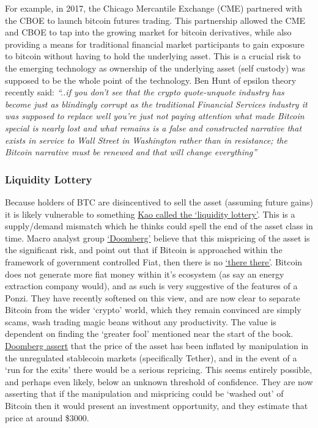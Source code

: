 For example, in 2017, the Chicago Mercantile Exchange (CME) partnered with the CBOE to launch bitcoin futures trading. This partnership allowed the CME and CBOE to tap into the growing market for bitcoin derivatives, while also providing a means for traditional financial market participants to gain exposure to bitcoin without having to hold the underlying asset. This is a crucial risk to the emerging technology as ownership of the underlying asset (self custody) was supposed to be the whole point of the technology. Ben Hunt of epsilon theory recently said: \textit{``..if you don't see that the crypto quote-unquote industry has become just as blindingly corrupt as the traditional Financial Services industry it was supposed to replace well you're just not paying attention what made Bitcoin special is nearly lost and what remains is a false and constructed narrative that exists in service to Wall Street in Washington rather than in resistance; the Bitcoin narrative must be renewed and that will change everything''}
\subsubsection{Liquidity Lottery}
Because holders of BTC are disincentived to sell the asset (assuming future gains) it is likely vulnerable to something \href{https://twitter.com/UrbanKaoboy/status/1526311908709502977}{Kao called the `liquidity lottery'}. This is a supply/demand mismatch which he thinks could spell the end of the asset class in time. Macro analyst group \href{https://doomberg.substack.com/}{`Doomberg'} believe that this mispricing of the asset is the significant risk, and point out that if Bitcoin is approached within the framework of government controlled Fiat, then there is no \href{https://en.wiktionary.org/wiki/there_is_no_there_there}{`there there'}. Bitcoin does not generate more fiat money within it's ecosystem (as say an energy extraction company would), and as such is very suggestive of the features of a Ponzi. They have recently softened on this view, and are now clear to separate Bitcoin from the wider `crypto' world, which they remain convinced are simply scams, wash trading magic beans without any productivity. The value is dependent on finding the `greater fool' mentioned near the start of the book. \href{https://doomberg.substack.com/p/dollars-ex-machina}{Doomberg assert} that the price of the asset has been inflated by manipulation in the unregulated stablecoin markets (specifically Tether), and in the event of a `run for the exits' there would be a serious repricing. This seems entirely possible, and perhaps even likely, below an unknown threshold of confidence. They are now asserting that if the manipulation and mispricing could be `washed out' of Bitcoin then it would present an investment opportunity, and they estimate that price at around \$3000. 
